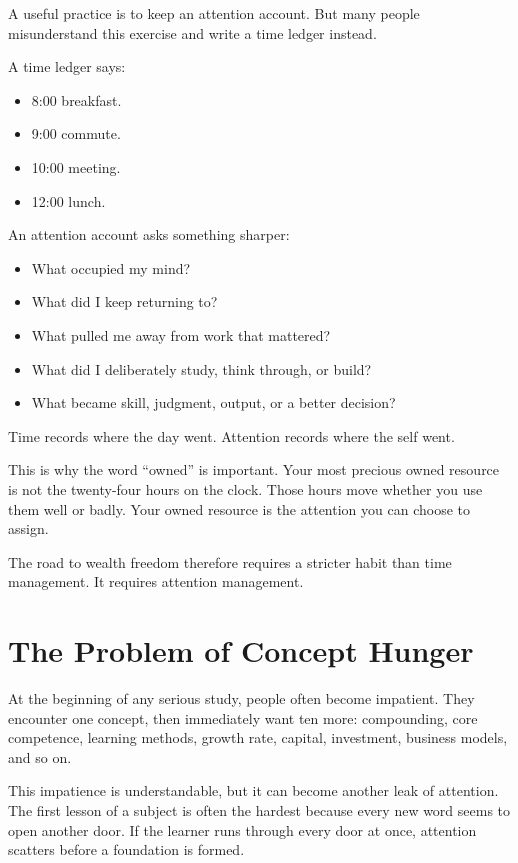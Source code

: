 A useful practice is to keep an attention account. But many people misunderstand this exercise and write a time ledger instead.

A time ledger says:

\begin{itemize}
\item 8:00 breakfast.
\item 9:00 commute.
\item 10:00 meeting.
\item 12:00 lunch.
\end{itemize}

An attention account asks something sharper:

\begin{itemize}
\item What occupied my mind?
\item What did I keep returning to?
\item What pulled me away from work that mattered?
\item What did I deliberately study, think through, or build?
\item What became skill, judgment, output, or a better decision?
\end{itemize}

Time records where the day went. Attention records where the self went.

This is why the word ``owned'' is important. Your most precious owned resource is not the twenty-four hours on the clock. Those hours move whether you use them well or badly. Your owned resource is the attention you can choose to assign.

The road to wealth freedom therefore requires a stricter habit than time management. It requires attention management.

\section*{The Problem of Concept Hunger}

At the beginning of any serious study, people often become impatient. They encounter one concept, then immediately want ten more: compounding, core competence, learning methods, growth rate, capital, investment, business models, and so on.

This impatience is understandable, but it can become another leak of attention. The first lesson of a subject is often the hardest because every new word seems to open another door. If the learner runs through every door at once, attention scatters before a foundation is formed.

